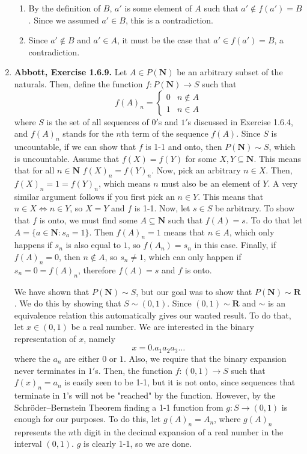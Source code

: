 \documentclass{article}
\newcommand{\N}{\mathbf{N}}
\newcommand{\R}{\mathbf{R}}
\newcommand{\exc}[2][Abbott]{\item \textbf{#1, Exercise #2.}}
\begin{document}
\begin{enumerate}
	\begin{enumerate}
		\item By the definition of $B$, $a'$ is some element of $A$ such that $a' \notin f(a') = B$. Since we assumed $a' \in B$, this is a contradiction.
		      		      		      	      	      	      	              
		\item Since $a' \notin B$ and $a' \in A$, it must be the case that $a' \in f(a') = B$, a contradiction.
	\end{enumerate}
				      	          
	\exc{1.6.9}
	Let $A \in P(\N)$ be an arbitrary subset of the naturals. Then, define the function $f : P(\N) \rightarrow S$ such that
	\begin{equation*}
		f(A)_n = \begin{cases}
		0 & n \notin A \\
		1 & n \in A
		\end{cases}
	\end{equation*}
	where $S$ is the set of all sequences of $0'$s and $1'$s discussed in Exercise 1.6.4, and $f(A)_n$ stands for the $n$th term of the sequence $f(A)$. Since $S$ is uncountable, if we can show that $f$ is 1-1 and onto, then $P(\N) \sim S$, which is uncountable. Assume that $f(X) = f(Y)$ for some $X, Y \subseteq \N$. This means that for all $n \in \N$ $f(X)_n = f(Y)_n$. Now, pick an arbitrary $n \in X$. Then, $f(X)_n = 1 = f(Y)_n$, which means $n$ must also be an element of $Y$. A very similar argument follows if you first pick an $n \in Y$. This means that $n \in X \iff n \in Y$, so $X = Y$ and $f$ is 1-1. Now, let $s \in S$ be arbitrary. To show that $f$ is onto, we must find some $A \subseteq \N$ such that $f(A) = s$. To do that let $A = \{a \in \N:s_a = 1\}$. Then $f(A)_n = 1$ means that $n \in A$, which only happens if $s_n$ is also equal to $1$, so $f(A_n) = s_n$ in this case. Finally, if $f(A)_n = 0$, then $n \notin A$, so $s_n \neq 1$, which can only happen if $s_n = 0 = f(A)_n$, therefore $f(A) = s$ and $f$ is onto. 
				      	          
	We have shown that $P(\N) \sim S$, but our goal was to show that $P(\N) \sim \R$. We do this by showing that $S \sim (0, 1)$. Since $(0, 1) \sim \R$ and $\sim$ is an equivalence relation this automatically gives our wanted result. To do that, let $x \in (0, 1)$ be a real number. We are interested in the binary representation of $x$, namely \begin{equation*}
	x = 0.a_1 a_2 a_3 \dots
	\end{equation*}
	where the $a_n$ are either $0$ or $1$. Also, we require that the binary expansion never terminates in $1'$s. Then, the function $f : (0, 1) \rightarrow S$ such that $f(x)_n = a_n$ is easily seen to be 1-1, but it is not onto, since sequences that terminate in $1$'s will not be "reached" by the function. However, by the Schröder–Bernstein Theorem finding a 1-1 function from $g : S \rightarrow (0, 1)$ is enough for our purposes. To do this, let $g(A)_n = A_n$, where $g(A)_n$ represents the $n$th digit in the decimal expansion of a real number in the interval $(0, 1)$. $g$ is clearly 1-1, so we are done.
					    

\end{enumerate}
\end{document}
